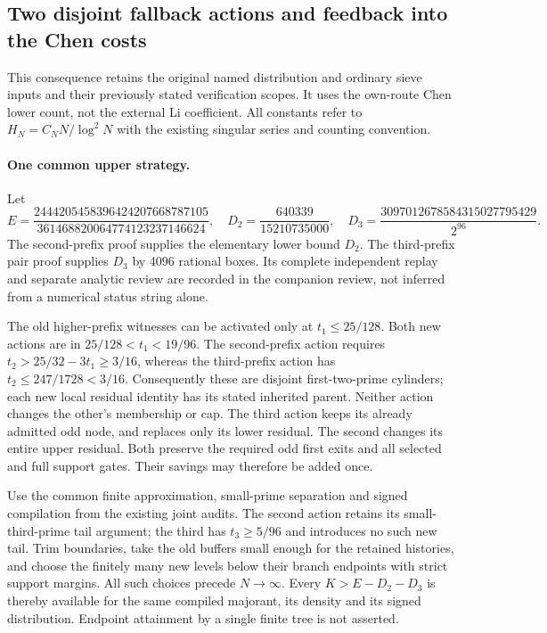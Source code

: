 \subsection{Two disjoint fallback actions and feedback into the Chen costs}
\label{sec:third-prefix-feedback-transfer-20261009}

This consequence retains the original named distribution and ordinary
sieve inputs and their previously stated verification scopes. It uses
the own-route Chen lower count, not the external Li coefficient.
All constants refer to $H_N=C_NN/\log^2N$ with the existing singular
series and counting convention.

\paragraph{One common upper strategy.}
Let
\[
 E=\frac{2444205458396424207668787105}{361468820064774123237146624},
 \quad D_2=\frac{640339}{15210735000},
 \quad D_3=\frac{3097012678584315027795429}{2^{96}}.
\]
The second-prefix proof supplies the elementary lower bound $D_2$.
The third-prefix pair proof supplies $D_3$ by 4096 rational boxes.
Its complete independent replay and separate analytic review are
recorded in the companion review, not inferred from a numerical status
string alone.

The old higher-prefix witnesses can be activated only at $t_1\le25/128$.
Both new actions are in $25/128<t_1<19/96$. The second-prefix action
requires $t_2>25/32-3t_1\ge3/16$, whereas the third-prefix action has
$t_2\le247/1728<3/16$. Consequently these are disjoint first-two-prime
cylinders; each new local residual identity has its stated inherited
parent. Neither action changes the other's membership or cap.
The third action keeps its already admitted odd node, and replaces
only its lower residual. The second changes its entire upper residual.
Both preserve the required odd first exits and all selected and full
support gates. Their savings may therefore be added once.

Use the common finite approximation, small-prime separation and signed
compilation from the existing joint audits. The second action retains
its small-third-prime tail argument; the third has $t_3\ge5/96$ and
introduces no such new tail. Trim boundaries, take the old buffers
small enough for the retained histories, and choose the finitely many
new levels below their branch endpoints with strict support margins.
All such choices precede $N\to\infty$. Every $K>E-D_2-D_3$ is thereby
available for the same compiled majorant, its density and its signed
distribution. Endpoint attainment by a single finite tree is not asserted.

